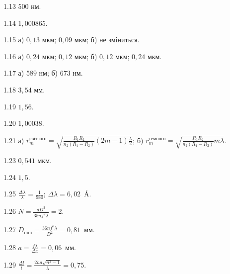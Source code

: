 \begin{Solution}{1.{13}}
	$ 500 $ нм.
\end{Solution}
\begin{Solution}{1.{14}}
	$ 1,000865 $.
\end{Solution}
\begin{Solution}{1.{15}}
	а) $ 0,13 $ мкм; $ 0,09 $ мкм; б) не зміниться.
\end{Solution}
\begin{Solution}{1.{16}}
	а) $ 0,24 $ мкм; $ 0,12 $ мкм; б) $ 0,12 $ мкм; $ 0,24 $ мкм.
\end{Solution}
\begin{Solution}{1.{17}}
	а) $ 589 $ нм; б) $ 673 $ нм.
\end{Solution}
\begin{Solution}{1.{18}}
	$ 3,54 $ мм.
\end{Solution}
\begin{Solution}{1.{19}}
	$ 1,56 $.
\end{Solution}
\begin{Solution}{1.{20}}
	$ 1,00038 $.
\end{Solution}
\begin{Solution}{1.{21}}
	а) $r_m^{\text{світлого}} = \sqrt{\frac{R_1R_2}{n_2(R_1 - R_2)} (2m-1)\frac\lambda2 }$; б)   $r_m^{\text{темного}} = \sqrt{\frac{R_1R_2}{n_2(R_1 - R_2)} m\lambda}$.
\end{Solution}
\begin{Solution}{1.{23}}
	$ 0,541 $ мкм.
\end{Solution}
\begin{Solution}{1.{24}}
	$ 1,5 $.
\end{Solution}
\begin{Solution}{1.{25}}
	$\frac{\Delta\lambda}{\lambda} = \frac1{980}$; $\Delta\lambda = 6,02$~\AA.
\end{Solution}
\begin{Solution}{1.{26}}
	$N = \frac{dD^2}{35nf^2\lambda} = 2$.
\end{Solution}
\begin{Solution}{1.{27}}
	$D_{\min} = \frac{36nf^2\lambda}{D^2} = 0,81$~мм.
\end{Solution}
\begin{Solution}{1.{28}}
	$a = \frac{f\lambda}{ \Delta x} = 0,06$~мм.
\end{Solution}
\begin{Solution}{1.{29}}
	$ \frac{\Delta l}{l}  = \frac{2ha\sqrt{n^2 - 1}}{\lambda} = 0,75$.
\end{Solution}
